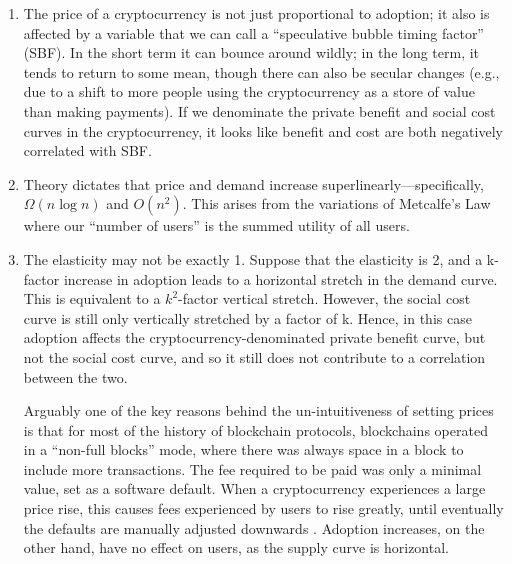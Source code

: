 \documentclass[12pt, final]{article}
\begin{document}
\begin{enumerate}
\item The price of a cryptocurrency is not just proportional to adoption; it also is affected by a variable that we can call a ``speculative bubble timing factor'' (SBF). In the short term it can bounce around wildly; in the long term, it tends to return to some mean, though there can also be secular changes (e.g., due to a shift to more people using the cryptocurrency as a store of value than making payments). If we denominate the private benefit and social cost curves in the cryptocurrency, it looks like benefit and cost are both negatively correlated with SBF. 

\item Theory dictates that price and demand increase superlinearly---specifically, $\Omega( n \log n )$ and $O(n^2)$. This arises from the variations of Metcalfe's Law where our ``number of users'' is the summed utility of all users. \cite{spectrumetcalfe}    

\item The elasticity may not be exactly 1. Suppose that the elasticity is 2, and a k-factor increase in adoption leads to a horizontal stretch in the demand curve. This is equivalent to a $k^2$-factor vertical stretch. However, the social cost curve is still only vertically stretched by a factor of k. Hence, in this case adoption affects the cryptocurrency-denominated private benefit curve, but not the social cost curve, and so it still does not contribute to a correlation between the two.

Arguably one of the key reasons behind the un-intuitiveness of setting prices is that for most of the history of blockchain protocols, blockchains operated in a ``non-full blocks'' mode, where there was always space in a block to include more transactions. The fee required to be paid was only a minimal value, set as a software default. When a cryptocurrency experiences a large price rise, this causes fees experienced by users to rise greatly, until eventually the defaults are manually adjusted downwards \cite{coindesk-btc-txn-fee, reddit-rec-miners, vitalik-twitter1}.  Adoption increases, on the other hand, have no effect on users, as the supply curve is horizontal.


\end{enumerate}
\end{document}

